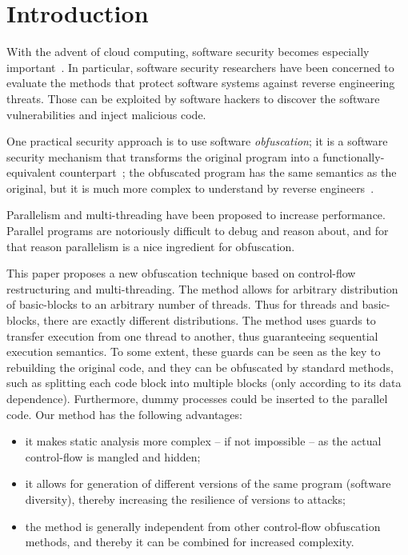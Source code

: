 \documentclass[3p,times,procedia,twocolumn,letterpaper]{elsarticle}
\begin{document}
\section{Introduction}

With the advent of cloud computing, software security becomes especially important~\cite{a}. In particular, software security researchers have been concerned to evaluate the methods that protect software systems against reverse engineering threats. Those can be exploited by software hackers to discover the software vulnerabilities and inject malicious code. 

One practical security approach is to use software \emph{obfuscation}; it is a software security
mechanism that transforms the original program into a functionally-equivalent counterpart~\cite{b,d}; the obfuscated program has the same semantics as the original, but it is much more complex to understand by reverse engineers~\cite{w}.

Parallelism and multi-threading have been proposed to increase performance. Parallel programs are notoriously difficult to debug and reason about, and for that reason parallelism is a nice ingredient for
obfuscation. 

This paper proposes a new obfuscation technique based on control-flow restructuring and multi-threading. The method allows for arbitrary distribution of basic-blocks to an arbitrary number of threads. Thus for  threads and  basic-blocks, there are exactly  different distributions. The method uses guards to transfer execution from one thread to another, thus guaranteeing sequential execution semantics. To some extent, these guards can be seen as the key to rebuilding the original code, and they can be obfuscated by standard methods, such as splitting each code block into multiple blocks (only according to its data dependence). Furthermore, dummy processes could be inserted to the parallel code. Our method has the following advantages:

\begin{itemize}
\item it makes static analysis more complex -- if not impossible -- as the actual control-flow is mangled and hidden;
\item it allows for generation of different versions of the same program (software diversity), thereby increasing the resilience of versions to attacks;
\item the method is generally independent from other control-flow obfuscation methods, and thereby it can be combined for increased complexity.
\end{itemize}
\end{document}
